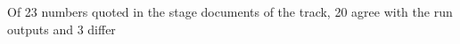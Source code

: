 Of 23 numbers quoted in the stage documents of the track, 20 agree with the run outputs and 3 differ